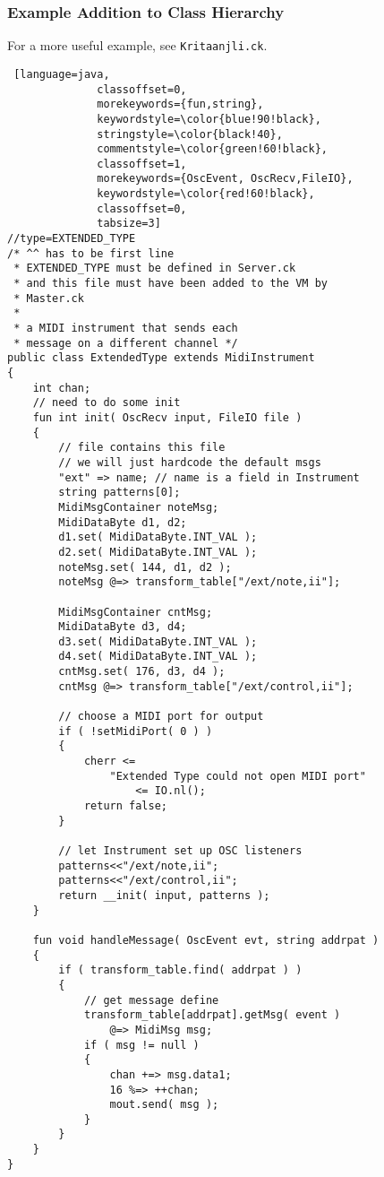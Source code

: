 \documentclass[12pt]{article}
\begin{document}
\subsubsection{Example Addition to Class Hierarchy}
For a more useful example, see \texttt{Kritaanjli.ck}.
\begin{lstlisting} [language=java,
			  classoffset=0,
			  morekeywords={fun,string},
			  keywordstyle=\color{blue!90!black},
			  stringstyle=\color{black!40},
			  commentstyle=\color{green!60!black},
			  classoffset=1,
			  morekeywords={OscEvent, OscRecv,FileIO},
			  keywordstyle=\color{red!60!black},
			  classoffset=0,
			  tabsize=3]
//type=EXTENDED_TYPE
/* ^^ has to be first line
 * EXTENDED_TYPE must be defined in Server.ck
 * and this file must have been added to the VM by
 * Master.ck 
 *
 * a MIDI instrument that sends each 
 * message on a different channel */
public class ExtendedType extends MidiInstrument
{
	int chan;
	// need to do some init
	fun int init( OscRecv input, FileIO file )
	{
		// file contains this file
		// we will just hardcode the default msgs
		"ext" => name; // name is a field in Instrument
		string patterns[0];
		MidiMsgContainer noteMsg;
		MidiDataByte d1, d2;
		d1.set( MidiDataByte.INT_VAL );
		d2.set( MidiDataByte.INT_VAL );
		noteMsg.set( 144, d1, d2 );
		noteMsg @=> transform_table["/ext/note,ii"];
		
		MidiMsgContainer cntMsg;
		MidiDataByte d3, d4;
		d3.set( MidiDataByte.INT_VAL );
		d4.set( MidiDataByte.INT_VAL );
		cntMsg.set( 176, d3, d4 );
		cntMsg @=> transform_table["/ext/control,ii"];
		
		// choose a MIDI port for output
		if ( !setMidiPort( 0 ) )
		{
			cherr <= 
				"Extended Type could not open MIDI port" 
					<= IO.nl();
			return false;
		}
		
		// let Instrument set up OSC listeners
		patterns<<"/ext/note,ii";
		patterns<<"/ext/control,ii";
		return __init( input, patterns );
	}
	
	fun void handleMessage( OscEvent evt, string addrpat )
	{
		if ( transform_table.find( addrpat ) )
		{
			// get message define
			transform_table[addrpat].getMsg( event ) 
				@=> MidiMsg msg;
			if ( msg != null )
			{
				chan +=> msg.data1;
				16 %=> ++chan;
				mout.send( msg );
			}
		}
	}
}

  
\end{lstlisting}
\end{document}
